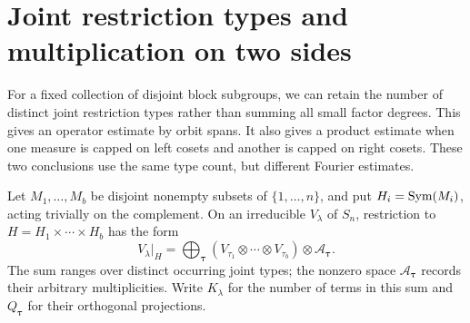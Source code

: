 \section{Joint restriction types and multiplication on two sides}
\label{l:two-sided-section}

For a fixed collection of disjoint block subgroups, we can retain the
number of distinct joint restriction types rather than summing all
small factor degrees.  This gives an operator estimate by orbit spans.
It also gives a product estimate when one measure is capped on left
cosets and another is capped on right cosets.  These two conclusions
use the same type count, but different Fourier estimates.

Let $M_1,\ldots,M_b$ be disjoint nonempty subsets of $\{1,\ldots,n\}$,
and put $H_i=\operatorname{Sym}(M_i)$, acting trivially on the complement.  On an
irreducible $V_\lambda$ of $S_n$, restriction to
$H=H_1\times\cdots\times H_b$ has the form
\begin{equation}\label{l:joint-decomposition}
 V_\lambda|_H
   =\bigoplus_{\boldsymbol\tau}
       (V_{\tau_1}\otimes\cdots\otimes V_{\tau_b})
                       \otimes\mathcal A_{\boldsymbol\tau}.
\end{equation}
The sum ranges over distinct occurring joint types; the nonzero
space $\mathcal A_{\boldsymbol\tau}$ records their arbitrary
multiplicities.  Write $K_\lambda$ for the number of terms in this
sum and $Q_{\boldsymbol\tau}$ for their orthogonal projections.

